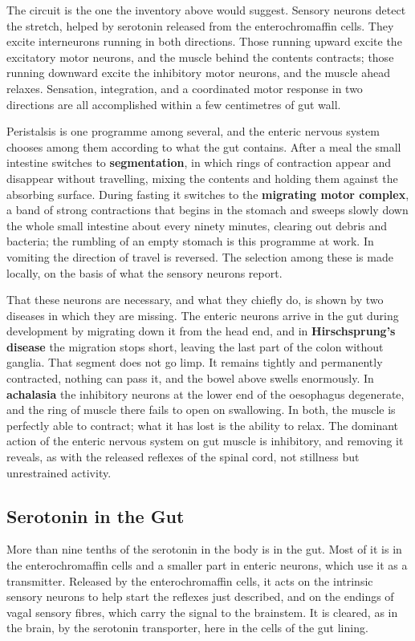 \documentclass[11pt]{article}
\begin{document}
The circuit is the one the inventory above would suggest. Sensory neurons detect the stretch, helped by serotonin released from the enterochromaffin cells. They excite interneurons running in both directions. Those running upward excite the excitatory motor neurons, and the muscle behind the contents contracts; those running downward excite the inhibitory motor neurons, and the muscle ahead relaxes. Sensation, integration, and a coordinated motor response in two directions are all accomplished within a few centimetres of gut wall.

Peristalsis is one programme among several, and the enteric nervous system chooses among them according to what the gut contains. After a meal the small intestine switches to \textbf{segmentation}, in which rings of contraction appear and disappear without travelling, mixing the contents and holding them against the absorbing surface. During fasting it switches to the \textbf{migrating motor complex}, a band of strong contractions that begins in the stomach and sweeps slowly down the whole small intestine about every ninety minutes, clearing out debris and bacteria; the rumbling of an empty stomach is this programme at work. In vomiting the direction of travel is reversed. The selection among these is made locally, on the basis of what the sensory neurons report.

That these neurons are necessary, and what they chiefly do, is shown by two diseases in which they are missing. The enteric neurons arrive in the gut during development by migrating down it from the head end, and in \textbf{Hirschsprung's disease} the migration stops short, leaving the last part of the colon without ganglia. That segment does not go limp. It remains tightly and permanently contracted, nothing can pass it, and the bowel above swells enormously. In \textbf{achalasia} the inhibitory neurons at the lower end of the oesophagus degenerate, and the ring of muscle there fails to open on swallowing. In both, the muscle is perfectly able to contract; what it has lost is the ability to relax. The dominant action of the enteric nervous system on gut muscle is inhibitory, and removing it reveals, as with the released reflexes of the spinal cord, not stillness but unrestrained activity.

\subsection{Serotonin in the Gut}

More than nine tenths of the serotonin in the body is in the gut. Most of it is in the enterochromaffin cells and a smaller part in enteric neurons, which use it as a transmitter. Released by the enterochromaffin cells, it acts on the intrinsic sensory neurons to help start the reflexes just described, and on the endings of vagal sensory fibres, which carry the signal to the brainstem. It is cleared, as in the brain, by the serotonin transporter, here in the cells of the gut lining.
\end{document}
